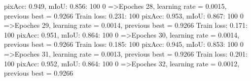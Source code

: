 pixAcc: 0.949, mIoU: 0.856: 100%
  0%
=>Epoches 28, learning rate = 0.0015,                 previous best = 0.9266
Train loss: 0.231: 100%
pixAcc: 0.953, mIoU: 0.867: 100%
  0%
=>Epoches 29, learning rate = 0.0014,                 previous best = 0.9266
Train loss: 0.171: 100%
pixAcc: 0.951, mIoU: 0.864: 100%
  0%
=>Epoches 30, learning rate = 0.0014,                 previous best = 0.9266
Train loss: 0.185: 100%
pixAcc: 0.945, mIoU: 0.853: 100%
  0%
=>Epoches 31, learning rate = 0.0013,                 previous best = 0.9266
Train loss: 0.201: 100%
pixAcc: 0.952, mIoU: 0.864: 100%
  0%
=>Epoches 32, learning rate = 0.0012,                 previous best = 0.9266
